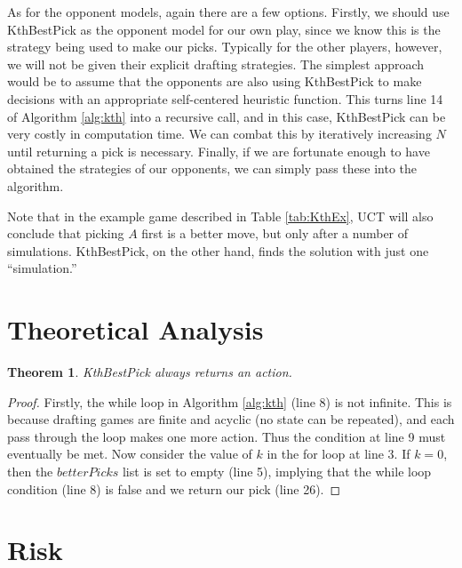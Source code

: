 \documentclass[letterpaper]{article}
\newtheorem{theorem1}{Theorem}
\numberwithin{equation}{section}
\numberwithin{theorem}{section}
\numberwithin{lemma}{section}
\numberwithin{df}{section}
\begin{document}
As for the opponent models, again there are a few options.  Firstly, we should use KthBestPick as the opponent model for our own play, since we know this is the strategy being used to make our picks.  Typically for the other players, however, we will not be given their explicit drafting strategies.  The simplest approach would be to assume that the opponents are also using KthBestPick to make decisions with an appropriate self-centered heuristic function.  This turns line 14 of Algorithm \ref{alg:kth} into a recursive call, and in this case, KthBestPick can be very costly in computation time.  We can combat this by iteratively increasing $N$ until returning a pick is necessary.  Finally, if we are fortunate enough to have obtained the strategies of our opponents, we can simply pass these into the algorithm.

Note that in the example game described in Table \ref{tab:KthEx}, UCT will also conclude that picking $A$ first is a better move, but only after a number of simulations.  KthBestPick, on the other hand, finds the solution with just one ``simulation.''

\section{Theoretical Analysis}

\begin{theorem1}
	\label{thm:Kth}
	KthBestPick always returns an action.
\end{theorem1}
\begin{proof}
Firstly, the while loop in Algorithm \ref{alg:kth} (line 8) is not infinite.  This is because drafting games are finite and acyclic (no state can be repeated), and each pass through the loop makes one more action.  Thus the condition at line 9 must eventually be met.  Now consider the value of $k$ in the for loop at line 3.  If $k = 0$, then the $betterPicks$ list is set to empty (line 5), implying that the while loop condition (line 8) is false and we return our pick (line 26).
\end{proof}

\section{Risk}
\end{document}
